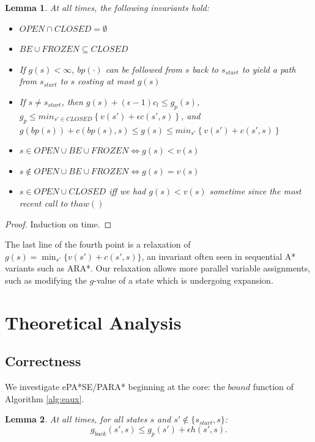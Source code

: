 \documentclass[letterpaper]{article}
\newtheorem{lemma}{Lemma}
\begin{document}
\begin{lemma}
\label{lem:prop}
At all times, the following invariants hold:
\begin{itemize}
\item $OPEN\cap CLOSED = \emptyset$
\item $BE\cup FROZEN \subseteq CLOSED$
\item If $g(s)<\infty$, $bp(\cdot)$ can be followed from $s$ back to $s_{start}$ to yield a path from $s_{start}$ to $s$ costing at most $g(s)$
\item If $s\ne s_{start}$, then $g(s) + (\epsilon-1)c_l \le g_p(s)$,
\\$g_p \le min_{s'\in CLOSED}\left\{v(s') + \epsilon c(s',s)\right\}$, and
\\$g(bp(s)) + c(bp(s),s) \le g(s) \le min_{s'}\left\{v(s') + c(s',s)\right\}$
\item $s\in OPEN\cup BE\cup FROZEN \Leftrightarrow g(s) < v(s)$
\item $s\notin OPEN\cup BE\cup FROZEN \Leftrightarrow g(s) = v(s)$
\item $s\in OPEN\cup CLOSED$ iff we had $g(s)<v(s)$ sometime since the most recent call to $thaw()$
\end{itemize}
\end{lemma}

\begin{proof}
Induction on time.
\end{proof}

The last line of the fourth point is a relaxation of $g(s) = \min_{s'}\{v(s') + c(s',s)\}$, an invariant often seen in sequential A* variants such as ARA*. Our relaxation allows more parallel variable assignments, such as modifying the $g$-value of a state which is undergoing expansion.

\section{Theoretical Analysis}

\subsection{Correctness}

We investigate ePA*SE/PARA* beginning at the core: the $bound$ function of Algorithm \ref{alg:eaux}.

\begin{lemma}
\label{lem:indep}
At all times, for all states $s$ and $s'\notin \{s_{start},s\}$:
\[g_{back}(s',s) \le g_p(s') + \epsilon h(s',s).\]
\end{lemma}
\end{document}
